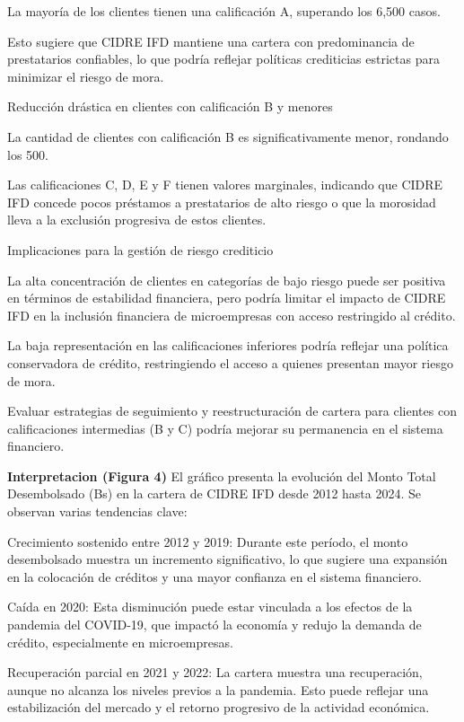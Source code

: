 \documentclass[Royal,times,sageh]{sagej}
\begin{document}
La mayoría de los clientes tienen una calificación A, superando los
6,500 casos.

Esto sugiere que CIDRE IFD mantiene una cartera con predominancia de
prestatarios confiables, lo que podría reflejar políticas crediticias
estrictas para minimizar el riesgo de mora.

Reducción drástica en clientes con calificación B y menores

La cantidad de clientes con calificación B es significativamente menor,
rondando los 500.

Las calificaciones C, D, E y F tienen valores marginales, indicando que
CIDRE IFD concede pocos préstamos a prestatarios de alto riesgo o que la
morosidad lleva a la exclusión progresiva de estos clientes.

Implicaciones para la gestión de riesgo crediticio

La alta concentración de clientes en categorías de bajo riesgo puede ser
positiva en términos de estabilidad financiera, pero podría limitar el
impacto de CIDRE IFD en la inclusión financiera de microempresas con
acceso restringido al crédito.

La baja representación en las calificaciones inferiores podría reflejar
una política conservadora de crédito, restringiendo el acceso a quienes
presentan mayor riesgo de mora.

Evaluar estrategias de seguimiento y reestructuración de cartera para
clientes con calificaciones intermedias (B y C) podría mejorar su
permanencia en el sistema financiero.

\textbf{Interpretacion (Figura 4)} El gráfico presenta la evolución del
Monto Total Desembolsado (Bs) en la cartera de CIDRE IFD desde 2012
hasta 2024. Se observan varias tendencias clave:

Crecimiento sostenido entre 2012 y 2019: Durante este período, el monto
desembolsado muestra un incremento significativo, lo que sugiere una
expansión en la colocación de créditos y una mayor confianza en el
sistema financiero.

Caída en 2020: Esta disminución puede estar vinculada a los efectos de
la pandemia del COVID-19, que impactó la economía y redujo la demanda de
crédito, especialmente en microempresas.

Recuperación parcial en 2021 y 2022: La cartera muestra una
recuperación, aunque no alcanza los niveles previos a la pandemia. Esto
puede reflejar una estabilización del mercado y el retorno progresivo de
la actividad económica.
\end{document}
